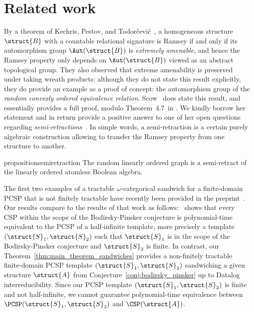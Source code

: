 \section{Related work}
\label{subsect:relatedwork}
 
 By a theorem of Kechris, Pestov, and Todor\v{c}evi\'c~\cite{kechris2005fraisse}, a homogeneous structure $\struct{B}$ with a countable relational signature is Ramsey if and only if its automorphism group $\Aut(\struct{B})$ is \emph{extremely amenable}, and hence the Ramsey property only depends on $\Aut(\struct{B})$ viewed as an abstract topological group.  
%
They also observed that extreme amenability is preserved under taking wreath products; although they do not state this result explicitly, they do provide an example as a proof of concept: the automorphism group of the \emph{random convexly ordered equivalence relation}.  
 Scow~\cite[Theorem~5.13]{scow2021ramsey} does state this result, and essentially provides a full proof, modulo Theorem~4.7~in \cite{kechris2005fraisse}.
 We kindly borrow her statement and in return provide a positive answer to one of her open questions regarding \emph{semi-retractions}~\cite[Question 4.3]{BARTOŠOVÁ_SCOW_2024}.
 In simple words, a semi-retraction is a certain purely algebraic construction allowing to transfer   the Ramsey property from one structure to another.   

\begin{restatable}{proposition}{semiretraction} \label{prop:rg_semiret_aba} 
  The random linearly ordered graph is a semi-retract of the linearly ordered atomless Boolean algebra. %
 \end{restatable}
 
 The first two examples of a tractable $\omega$-categorical sandwich for a finite-domain PCSP that is not finitely tractable have  recently been provided in the preprint~\cite[Propositions~35 and~36]{Mottet_2025}. Our results compare to the results of that work as follows:~\cite[Theorem 1]{Mottet_2025}  shows that every CSP within the scope of the Bodirsky-Pinsker conjecture is polynomial-time equivalent to the PCSP of a half-infinite template, more precisely a template $(\struct{S}_1,\struct{S}_2)$ such that $\struct{S}_1$ is in the scope of the Bodirsky-Pinsker conjecture and $\struct{S}_2$ is finite.
%
In contrast, our Theorem~\ref{thm:main_theorem_sandwiches} provides a non-finitely tractable finite-domain PCSP template $(\struct{S}_1,\struct{S}_2)$ sandwiching a given structure $\struct{A}$ from Conjecture~\ref{conj:bodirsky_pinsker} up to Datalog interreducibility.
%
Since our PCSP template $(\struct{S}_1,\struct{S}_2)$ is finite and not half-infinite, we cannot guarantee polynomial-time equivalence between $\PCSP(\struct{S}_1,\struct{S}_2)$ and $\CSP(\struct{A})$.